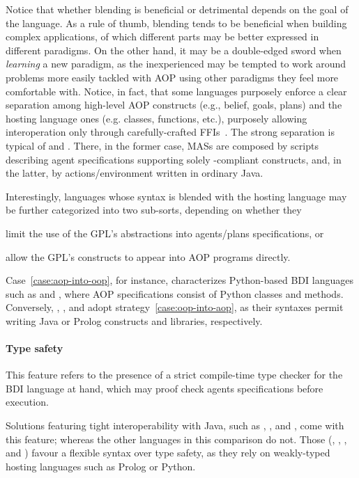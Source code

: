 Notice that whether blending is beneficial or detrimental depends on the goal of the language.
%
As a rule of thumb,
blending tends to be beneficial when building complex applications,
of which different parts may be better expressed in different paradigms.
%
On the other hand,
it may be a double-edged sword when \emph{learning} a new paradigm,
as the inexperienced may be tempted to work around problems more easily tackled with \ac{AOP} using other paradigms they feel more comfortable with.
%
Notice, in fact,
that some languages purposely enforce a clear separation among high-level AOP constructs
(e.g., belief, goals, plans)
and the hosting language ones (e.g. classes, functions, etc.),
purposely allowing interoperation only through carefully-crafted \acp{FFI}~\cite{DBLP:conf/eumas/BergentiMP23}.
%
The strong separation is typical of
\jason{} and \jadex{}.
%
There, in the former case, \acp{MAS} are composed by scripts describing agent specifications
supporting solely \agentspeak{}-compliant constructs,
and, in the latter, by actions/environment written in ordinary Java.

Interestingly,
languages whose syntax is blended with the hosting language may be further categorized into two sub-sorts,
depending on whether they
%
\begin{inlinelist}
    \item\label{case:aop-into-oop}
    limit the use of the \ac{GPL}'s abstractions into agents/plans specifications, or
    \item\label{case:oop-into-aop} allow the \ac{GPL}'s constructs to appear into \ac{AOP} programs directly.
\end{inlinelist}
%
Case~\ref{case:aop-into-oop}, for instance,
characterizes Python-based \ac{BDI} languages such as \spadebdi{} and \phidias{},
where AOP specifications consist of Python classes and methods.
%
Conversely, \astra{}, \jack{}, and \goal{} adopt strategy~\ref{case:oop-into-aop},
as their syntaxes permit writing Java or Prolog constructs and libraries, respectively.

\paragraph{Type safety}
%
This feature refers to the presence of a strict compile-time type checker for the \ac{BDI} language at hand,
which may proof check agents specifications before execution.

Solutions featuring tight interoperability with Java,
such as \astra{}, \jack{}, and \jadex,
come with this feature;
whereas the other languages in this comparison do not.
%
Those (\jason{}, \spadebdi{}, \phidias{}, and \goal{})
favour a flexible syntax over type safety,
as they rely on weakly-typed hosting languages such as Prolog or Python.


